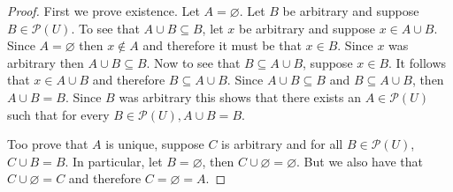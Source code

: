 \documentclass{article}
\newcommand{\pwset}{\mathscr{P}}
\begin{document}
\begin{proof}
First we prove existence. Let $A = \varnothing$. Let $B$ be arbitrary and suppose $B \in \pwset(U)$. To see that $A \cup B \subseteq B$, let $x$ be arbitrary and suppose $x \in A \cup B$. Since $A = \varnothing$ then $x \notin A$ and therefore it must be that $x \in B$. Since $x$ was arbitrary then $A \cup B \subseteq B$. Now to see that $B \subseteq A \cup B$, suppose $x \in B$. It follows that $x \in A \cup B$ and therefore $B \subseteq A \cup B$. Since $A \cup B \subseteq B$ and $B \subseteq A \cup B$, then $A \cup B = B$. Since $B$ was arbitrary this shows that there exists an $A \in \pwset(U)$ such that for every $B \in \pwset(U), A \cup B = B$.

Too prove that $A$ is unique, suppose $C$ is arbitrary and for all $B \in \pwset(U)$, $C \cup B = B$. In particular, let $B = \varnothing$, then $C \cup \varnothing = \varnothing$. But we also have that $C \cup \varnothing = C$ and therefore $C = \varnothing = A$. 
\end{proof}
\end{document}
